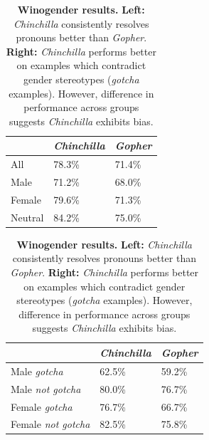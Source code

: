 \documentclass[11pt, a4paper, logo, copyright, nonumbering]{deepmind}
\newcommand{\gopher}{\textit{Gopher}\xspace}
\newcommand{\chinchilla}{\textit{Chinchilla}\xspace}
\begin{document}
\begin{table}[t]
    \begin{subtable}[h]{0.45\textwidth}
        \centering
        \begin{tabular}{l | l | l}
    \toprule
    & \chinchilla & \gopher \\
    \midrule
    All & 78.3\% & 71.4\% \\
    Male & 71.2\% & 68.0\% \\
    Female & 79.6\% & 71.3\% \\
    Neutral & 84.2\% & 75.0\% \\
    \bottomrule
       \end{tabular}
       \label{tab:fairness1}
    \end{subtable}
    \hfill
    \begin{subtable}[h]{0.5\textwidth}
        \centering
        \begin{tabular}{l | l | l}
    \toprule
    & \chinchilla & \gopher \\
    \midrule
    Male \textit{gotcha} & 62.5\% & 59.2\% \\
    Male \textit{not gotcha} & 80.0\% & 76.7\% \\
    Female \textit{gotcha} & 76.7\% & 66.7\% \\
    Female \textit{not gotcha} & 82.5\% & 75.8\% \\ 
    \bottomrule
        \end{tabular}
        \label{tab:fairness2}
     \end{subtable}
     \caption{\textbf{Winogender results.} \textbf{Left:} \chinchilla consistently resolves pronouns better than \gopher.  \textbf{Right:} \chinchilla performs better on examples which contradict gender stereotypes (\textit{gotcha} examples).  However, difference in performance across groups suggests \chinchilla exhibits bias.}
     \label{tab:fairness}
\end{table}
\end{document}
